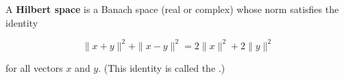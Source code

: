 A \textbf{Hilbert space} is a Banach space (real or complex) whose norm satisfies the identity

\begin{equation}\label{eq:parallelogram-law}
\|x + y\|^2 + \|x - y\|^2 = 2\|x\|^2 + 2\|y\|^2
\end{equation}

for all vectors $x$ and $y$. (This identity is called the .)
